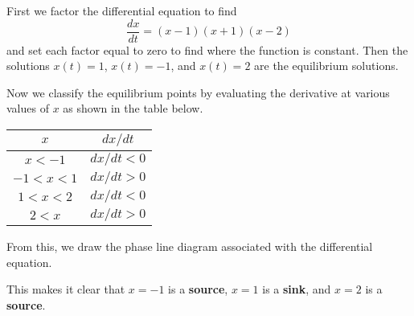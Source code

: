 \documentclass[11pt, titlepage]{article}
\newcommand*{\TickSize}{2pt}%
\newcommand*{\AxisMin}{0}%
\newcommand*{\AxisMax}{0}%
\newcommand*{\DrawHorizontalPhaseLine}[4][]{%
    \gdef\AxisMin{0}%
    \gdef\AxisMax{0}%
    \edef\MyList{#2}%
    \foreach \X in \MyList {
        \draw  (\X,\TickSize) -- (\X,-\TickSize) node [below] {$\X$};
        \ifnum\AxisMin>\X
            \xdef\AxisMin{\X}%
        \fi
        \ifnum\AxisMax<\X
            \xdef\AxisMax{\X}%
        \fi
    }

    \edef\MyList{#3}%
    \foreach \X in \MyList {%
        \draw [->] (\X-0.1,0) -- (\X,0);
        \ifnum\AxisMin>\X
            \xdef\AxisMin{\X}%
        \fi
        \ifnum\AxisMax<\X
            \xdef\AxisMax{\X}%
        \fi
    }

    \edef\MyList{#4}%
    \foreach \X in \MyList {%
        \draw [<-] (\X-0.1,0) -- (\X,0);
        \ifnum\AxisMin>\X
            \xdef\AxisMin{\X}%
        \fi
        \ifnum\AxisMax<\X
            \xdef\AxisMax{\X}%
        \fi
    }

    \draw  (\AxisMin-1,0) -- (\AxisMax+1,0) node [right] {#1};
}
\begin{document}
  \begin{solution}
    First we factor the differential equation to find
    \begin{equation*}
      \frac{dx}{dt} = (x - 1) (x + 1) (x - 2)
    \end{equation*}
    and set each factor equal to zero to find where the function is constant.
    Then the solutions \(x(t) = 1\), \(x(t) = -1\), and \(x(t) = 2\) are the equilibrium solutions.

    Now we classify the equilibrium points by evaluating the derivative at various values of \(x\) as shown in the table below.
    \begin{center}
      \begin{tabular}{ |c|c| }
        \hline
        \(x\) & \(dx/dt\) \\
        \hline
        \(x < -1\) & \(dx/dt < 0\) \\
        \hline
        \(-1 < x < 1\) & \(dx/dt > 0\) \\
        \hline
        \(1 < x < 2\) & \(dx/dt < 0\) \\
        \hline
        \(2 < x\) & \(dx/dt > 0\) \\
        \hline
      \end{tabular}
    \end{center}

    From this, we draw the phase line diagram associated with the differential equation.

    \begin{figure}[h]
      \centering
    \end{figure}

    This makes it clear that \(x = -1\) is a \textbf{source}, \(x = 1\) is a \textbf{sink}, and \(x = 2\) is a \textbf{source}.
  \end{solution}
\end{document}
